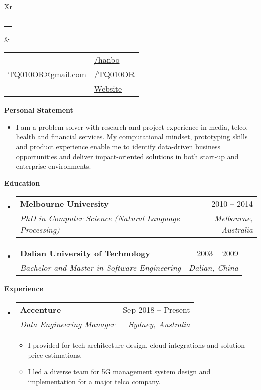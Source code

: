 \documentclass[letterpaper,12pt]{article}[leftmargin=*]
\makeatletter
\def \fullname {Bo HAN}
\def \subtitle {}
\def \linkedinicon {\faLinkedin}
\def \linkedinlink {https://linkedin.com/in/hanbo/}
\def \linkedintext {/hanbo}
\def \phoneicon {\faPhone}
\def \phonetext {+61-425-719-696}
\def \emailicon {\faEnvelope}
\def \emaillink {mailto:tq010or@gmail.com}
\def \emailtext {TQ010OR@gmail.com}
\def \githubicon {\faGithub}
\def \githublink {https://github.com/tq010or}
\def \githubtext {/TQ010OR}
\def \websiteicon {\faGlobe}
\def \websitelink {http://tq010or.github.io/}
\def \websitetext {Website}
\def \headertype {\doublecol} %
\def \entryspacing {-0pt}
\def \linkedin {\linkedinicon \hspace{3pt}\href{\linkedinlink}{\linkedintext}}
\def \phone {\phoneicon \hspace{3pt}{ \phonetext}}
\def \email {\emailicon \hspace{3pt}\href{\emaillink}{\emailtext}}
\def \github {\githubicon \hspace{3pt}\href{\githublink}{\githubtext}}
\def \website {\websiteicon \hspace{3pt}\href{\websitelink}{\websitetext}}
\renewcommand{\section}[2]{\vspace{5pt}
  \colorbox{secondary}{\color{white}\raggedbottom\normalsize\textbf{{#1}{\hspace{7pt}#2}}}
}
\newcommand{\resumeEntryStart}{\begin{itemize}[leftmargin=2.5mm]}
\newcommand{\resumeEntryEnd}{\end{itemize}\vspace{\entryspacing}}
\newcommand{\resumeItemListStart}{\begin{itemize}[leftmargin=4.5mm]}
\newcommand{\resumeItemListEnd}{\end{itemize}}
\newcommand{\resumeItem}[1]{
  \item\small{
    {#1 \vspace{-2pt}}
  }
}
\newcommand{\resumeEntryTSDL}[4]{
  \vspace{-1pt}\item[]
    \begin{tabularx}{0.97\textwidth}{X@{\hspace{60pt}}r}
      \textbf{\color{primary}#1} & {\firabook\color{accent}\small#2} \\
      \textit{\color{accent}\small#3} & \textit{\color{accent}\small#4} \\
    \end{tabularx}\vspace{-6pt}
}
\newcommand{\doublecol}[6]{
  \begin{tabularx}{\textwidth}{Xr}
    {
      \begin{tabular}[c]{l}
        \fontsize{35}{45}\selectfont{\color{primary}{{\textbf{\fullname}}}} \\
        {\textit{\subtitle}} %
      \end{tabular}
    } & {
      \begin{tabular}[c]{l@{\hspace{1.5em}}l}
        {\small#4} & {\small#1} \\
        {\small#5} & {\small#2} \\
        {\small#6} & {\small#3}
      \end{tabular}
    }
  \end{tabularx}
}
\newcommand{\singlecol}[6]{
  \begin{tabularx}{\textwidth}{Xr}
    {
      \begin{tabular}[b]{l}
        \fontsize{35}{45}\selectfont{\color{primary}{{\textbf{\fullname}}}} \\
        {\textit{\subtitle}} %
      \end{tabular}
    } & {
      \begin{tabular}[c]{l}
        {\small#1} \\
        {\small#2} \\
        {\small#3} \\
        {\small#4} \\
        {\small#5} \\
        {\small#6}
      \end{tabular}
    }
  \end{tabularx}
}
\makeatother
\begin{document}


\headertype{\linkedin}{\github}{\website}{\phone}{\email}{} %
\vspace{-10pt} %

\section{\faFlask}{Personal Statement}

    \resumeItemListStart
      \resumeItem {I am a problem solver with research and project experience in media, telco, health and financial services. My computational mindset, prototyping skills and product experience enable me to identify data-driven business opportunities and deliver impact-oriented solutions in both start-up and enterprise environments.}
    \resumeItemListEnd

\section{\faGraduationCap}{Education}

  \resumeEntryStart
    \resumeEntryTSDL
      {Melbourne University}{2010 -- 2014}
      {PhD in Computer Science (Natural Language Processing)}{Melbourne, Australia}
    \resumeEntryTSDL
      {Dalian University of Technology}{2003 -- 2009}
      {Bachelor and Master in Software Engineering}{Dalian, China}
  \resumeEntryEnd

\section{\faPieChart}{Experience}

  \resumeEntryStart
    \resumeEntryTSDL
      {Accenture}{Sep 2018 -- Present}
      {Data Engineering Manager}{Sydney, Australia}
    \resumeItemListStart
      \resumeItem {I provided for tech architecture design, cloud integrations and solution price estimations.}
      \resumeItem {I led a diverse team for 5G management system design and implementation for a major telco company.}
    \resumeItemListEnd
  \resumeEntryEnd
\end{document}
